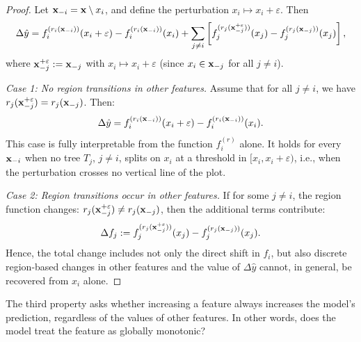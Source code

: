 \begin{proof}
Let \( \mathbf{x}_{-i} = \mathbf{x} \setminus x_i \), and define the perturbation \( x_i \mapsto x_i + \varepsilon \). Then
\[
\Delta \hat{y} = f_i^{(r_i(\mathbf{x}_{-i}))}(x_i + \varepsilon) - f_i^{(r_i(\mathbf{x}_{-i}))}(x_i)
+ \sum_{j \ne i} \left[ f_j^{(r_j(\mathbf{x}_{-j}^{+\varepsilon}))}(x_j) - f_j^{(r_j(\mathbf{x}_{-j}))}(x_j) \right],
\]
where \( \mathbf{x}_{-j}^{+\varepsilon} := \mathbf{x}_{-j} \) with \( x_i \mapsto x_i + \varepsilon \) (since \( x_i \in \mathbf{x}_{-j} \) for all \( j \ne i \)).

\textit{Case 1: No region transitions in other features.}
Assume that for all \( j \ne i \), we have \( r_j(\mathbf{x}_{-j}^{+\varepsilon}) = r_j(\mathbf{x}_{-j}) \). Then:
\[
\Delta \hat{y} = f_i^{(r_i(\mathbf{x}_{-i}))}(x_i + \varepsilon) - f_i^{(r_i(\mathbf{x}_{-i}))}(x_i).
\]
This case is fully interpretable from the function \( f_i^{(r)} \) alone.
It holds for every \( \mathbf{x}_{-i} \) when no tree \( T_j \), \( j \ne i \), splits on \( x_i \) at a threshold in \( [x_i, x_i + \varepsilon) \), i.e., when the perturbation crosses no vertical line of the plot.

\textit{Case 2: Region transitions occur in other features.}
If for some \( j \ne i \), the region function changes: \( r_j(\mathbf{x}_{-j}^{+\varepsilon}) \ne r_j(\mathbf{x}_{-j}) \), then the additional terms contribute:
\[
\Delta f_j := f_j^{(r_j(\mathbf{x}_{-j}^{+\varepsilon}))}(x_j) - f_j^{(r_j(\mathbf{x}_{-j}))}(x_j).
\]
Hence, the total change includes not only the direct shift in \( f_i \), but also discrete region-based changes in other features and the value of \( \Delta \hat{y} \) cannot, in general, be recovered from \( x_i \) alone. 
\end{proof}

The third property asks whether increasing a feature always increases the model's prediction, regardless of the values of other features. In other words, does the model treat the feature as globally monotonic?

